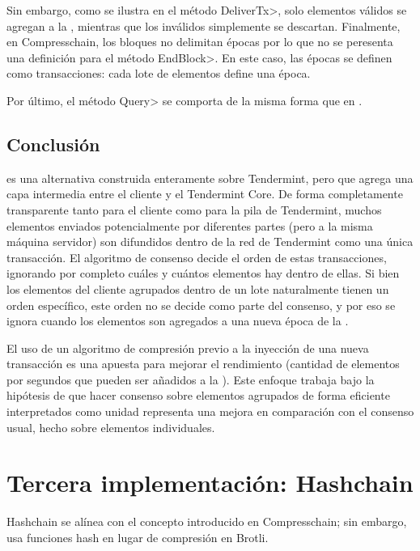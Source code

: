 %
Sin embargo, como se ilustra en el método \<DeliverTx>, solo elementos válidos se agregan a la \setchain,
mientras que los inválidos simplemente se descartan.
%
Finalmente, en Compresschain, los bloques no delimitan épocas por lo que no se peresenta una definición para
el método \<EndBlock>.
En este caso, las épocas se definen como transacciones: cada lote de elementos define una época.

%

Por último, el método \<Query> se comporta de la misma forma que en \vanilla.

\subsection{Conclusión}
\compresschain es una alternativa construida enteramente sobre Tendermint, pero que agrega una capa
intermedia entre el cliente y el Tendermint Core.
De forma completamente transparente tanto para el
cliente como para la pila de Tendermint, muchos elementos enviados potencialmente por diferentes partes
(pero a la misma máquina servidor)
son difundidos dentro de la red de Tendermint como una única transacción.
El algoritmo de consenso
decide el orden de estas transacciones, ignorando por completo cuáles y cuántos elementos hay dentro de ellas.
Si bien los elementos del cliente agrupados dentro de un lote naturalmente tienen un orden específico,
este orden no se decide como parte del consenso, y por eso se ignora cuando los elementos son agregados
a una nueva época de la \setchain.

%

El uso de un algoritmo de compresión previo a la inyección de una nueva transacción es una apuesta para mejorar
el rendimiento (cantidad de elementos por segundos que pueden ser añadidos a la \setchain).
Este enfoque trabaja bajo la hipótesis
de que hacer consenso sobre elementos agrupados de forma eficiente interpretados como unidad representa una
mejora en comparación con el consenso usual, hecho sobre elementos individuales.

\section{Tercera implementación: Hashchain}\label{sec:hashchain}
%
Hashchain se alínea con el concepto introducido en Compresschain; sin embargo, usa
funciones hash en lugar de compresión en Brotli.

